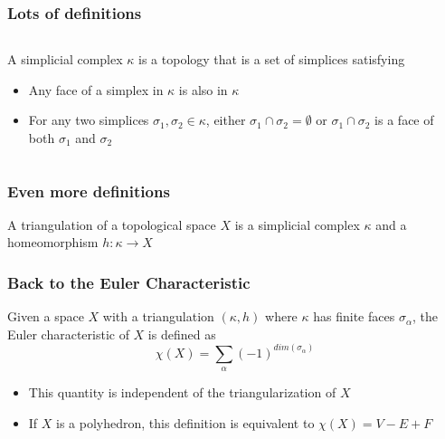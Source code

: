 \documentclass{beamer}
\begin{document}
\begin{frame}
    \frametitle{Lots of definitions}
    \begin{columns}
            \begin{definition}
                A simplicial complex $\kappa$ is a topology that is a set of simplices satisfying
                \begin{itemize}
                    \item Any face of a simplex in $\kappa$ is also in $\kappa$
                    \item For any two simplices $\sigma_1, \sigma_2 \in \kappa$, either $\sigma_1 \cap \sigma_2 = \emptyset$ or $\sigma_1 \cap \sigma_2$ is a face of both $\sigma_1$ and $\sigma_2$
                \end{itemize}
            \end{definition}
    \end{columns}

\end{frame}
\begin{frame}
    \frametitle{Even more definitions}
    \begin{definition}
        A triangulation of a topological space $X$ is a simplicial complex $\kappa$ and a homeomorphism $h: \kappa \rightarrow X$
    \end{definition}
\end{frame}

\begin{frame}
    \frametitle{Back to the Euler Characteristic}
    \begin{definition}
        Given a space $X$ with a triangulation $(\kappa, h)$ where $\kappa$ has finite faces $\sigma_\alpha$, the Euler characteristic of $X$ is defined as $$\chi(X)=\sum_{\alpha}(-1)^{dim(\sigma_\alpha)}$$
    \end{definition}
    \begin{itemize}
        \item This quantity is independent of the triangularization of $X$
        \item If $X$ is a polyhedron, this definition is equivalent to $\chi(X) = V - E + F$
    \end{itemize}
\end{frame}
\end{document}

